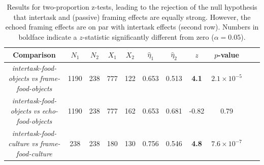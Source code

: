 \documentclass[12pt]{article}
\begin{document}
\begin{table}
\begin{center}
\begin{tabular}{c c c c c c c c c c c }
	\toprule
	Comparison & $N_1$ & $N_2$ & $X_1$ & $X_2$ & $\hat{\eta}_1$ 
		& $\hat{\eta}_2$ & $z$ & $p$-value \\ 
	\midrule
	\parbox[c]{4cm}{\textit{intertask-food-objects} 
	\textit{vs} \textit{frame-food-objects}} & 1190 & 238 & 777 & 122 &
	0.653 & 0.513 & \textbf{4.1} & $2.1 \times 10^{-5}$ \\ 

\noalign{\smallskip}
\hdashline
\noalign{\smallskip}

	\parbox[c]{4cm}{\textit{intertask-food-objects} 
	\textit{vs} \textit{echo-food-objects}} & 1190 & 238 & 777 & 162 
		& 0.653 & 0.681 & -0.82 & 0.79 \\

\noalign{\smallskip}
\hdashline
\noalign{\smallskip}

	\parbox[c]{4cm}{\textit{intertask-food-culture} 
	\textit{vs} \textit{frame-food-culture}} & 238 & 238 & 180 & 130 
	& 0.756 & 0.546 & \textbf{4.8} & $7.6 \times 10^{-7}$ \\
	\bottomrule

\end{tabular}

\caption{
	Results for two-proportion z-tests, leading to the rejection of the null 
	hypothesis that intertask and (passive) framing effects are equally 
	strong.  However, the echoed framing effects are on par with intertask
	effects (second row). 
	Numbers in boldface indicate a $z$-statistic significantly 
	different from zero ($\alpha=0.05$).
}
\label{table:intertask_framing}
\end{center}
\end{table}
\end{document}

